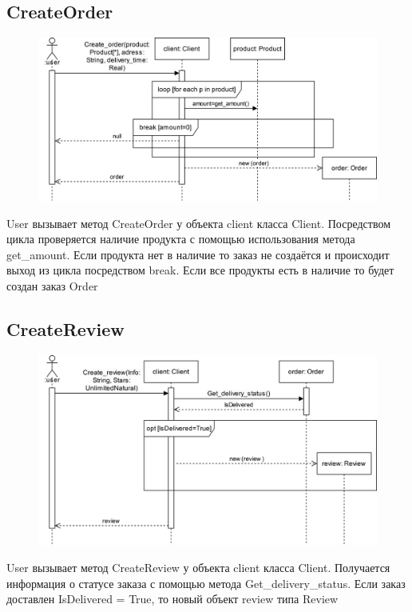 \documentclass[a4paper]{report}
\begin{document}
\subsection{CreateOrder}
\begin{figure}[H]
    \centering
    \includegraphics[width=\textwidth]{Диаграмма последовательностей create_order.png}
\end{figure}
User вызывает метод CreateOrder у объекта client класса Client. Посредством цикла проверяется наличие продукта с помощью использования метода get\_amount. Если продукта нет в наличие то заказ не создаётся и происходит выход из цикла посредством break. Если все продукты есть в наличие то будет создан заказ Order

\subsection{CreateReview}
\begin{figure}[H]
    \centering
    \includegraphics[width=\textwidth]{Диаграмма последовательностей create_review.png}
\end{figure}
User вызывает метод CreateReview у объекта client класса Client. Получается информация о статусе заказа с помощью метода Get\_delivery\_status. Если заказ доставлен IsDelivered = True, то новый объект review типа Review
\end{document}

